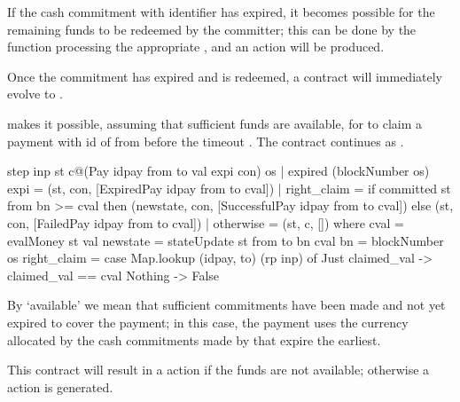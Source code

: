\documentclass[runningheads]{llncs}
\begin{document}
If the cash commitment with identifier  has expired, it becomes possible for the remaining funds 
to be redeemed by the committer; this can be done by the  function processing the appropriate 
, and an  action will be produced. 

Once the commitment  has expired and is redeemed, a  contract 
will 
immediately evolve to .

\medskip
\noindent
{} makes it possible, assuming that sufficient funds are available, for 
 to claim a payment with id  of  from  
before the timeout . The contract continues as . 

\begin{haskellcode}
step inp st c@(Pay idpay from to val expi con) os
  | expired (blockNumber os) expi = (st, con, [ExpiredPay idpay from to cval])
  | right_claim =
    if committed st from bn >= cval
      then (newstate, con, [SuccessfulPay idpay from to cval])
      else (st, con, [FailedPay idpay from to cval])
  | otherwise = (st, c, [])
  where
    cval = evalMoney st val
    newstate = stateUpdate st from to bn cval
    bn = blockNumber os
    right_claim =
      case Map.lookup (idpay, to) (rp inp) of
        Just claimed_val -> claimed_val == cval
        Nothing -> False
\end{haskellcode}
By `available' we mean that sufficient commitments have been made and not yet expired to cover the payment; in this 
case, the payment uses the currency allocated by the cash commitments made by  that expire the 
earliest.

This contract will result in a  action if the funds are not available; otherwise a 
 action is generated.
\end{document}
